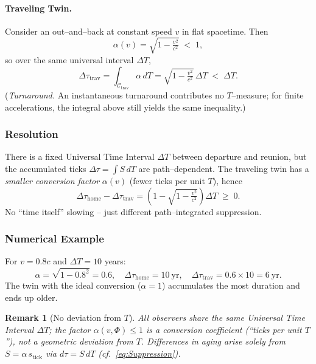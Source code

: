 \documentclass[12pt]{article}
\theoremstyle{plain}
\newtheorem{remark}{Remark}
\begin{document}
\paragraph{Traveling Twin.}
Consider an out–and–back at constant speed $v$ in flat spacetime. Then
\begin{equation}
\alpha(v)=\sqrt{1-\tfrac{v^2}{c^2}} \;<\; 1,
\label{eq:AlphaTrav}
\end{equation}
so over the same universal interval $\Delta T$,
\begin{equation}
\Delta\tau_{\text{trav}}=\int_{\mathcal{C}_{\text{trav}}} \alpha\, dT
= \sqrt{1-\tfrac{v^2}{c^2}}\, \Delta T \;<\; \Delta T .
\label{eq:TravTwin}
\end{equation}
(\emph{Turnaround.} An instantaneous turnaround contributes no $T$–measure; for finite accelerations, the integral above still yields the same inequality.)

\subsubsection*{Resolution}
There is a fixed Universal Time Interval $\Delta T$ between departure and reunion, but the 
accumulated ticks $\Delta\tau=\int S\,dT$ are path–dependent. The traveling twin has a 
\emph{smaller conversion factor} $\alpha(v)$ (fewer ticks per unit $T$), hence
\begin{equation}
\Delta\tau_{\text{home}}-\Delta\tau_{\text{trav}}
= \left(1-\sqrt{1-\tfrac{v^2}{c^2}}\right)\Delta T \;\ge\; 0.
\label{eq:TwinDifference}
\end{equation}
No “time itself” slowing – just different path–integrated suppression.

\subsubsection*{Numerical Example}
For $v=0.8c$ and $\Delta T=10$ years:
\begin{equation}
\alpha=\sqrt{1-0.8^2}=0.6,\quad 
\Delta\tau_{\text{home}}=10~\text{yr},\quad 
\Delta\tau_{\text{trav}}=0.6\times 10=6~\text{yr}.
\label{eq:NumericExample}
\end{equation}
The twin with the ideal conversion ($\alpha=1$) accumulates the most duration and ends up older.

\begin{remark}[No deviation from $T$]
All observers share the same Universal Time Interval $\Delta T$; the factor $\alpha(v,\Phi)\le 1$ is a 
conversion coefficient (“ticks per unit $T$”), not a geometric deviation from $T$. Differences in aging arise solely from $S=\alpha\,s_{\text{tick}}$ via $d\tau=S\,dT$ (cf.~\eqref{eq:Suppression}).
\end{remark}
\end{document}
